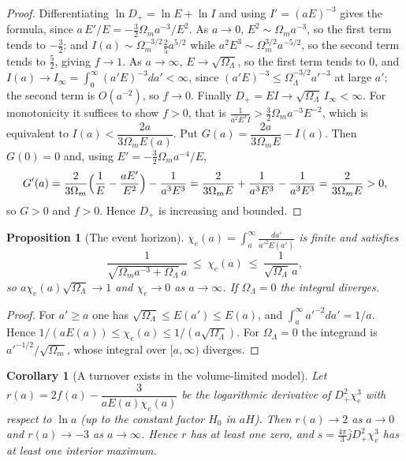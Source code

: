 \documentclass[11pt,oneside]{book}
\newtheorem{proposition}[theorem]{Proposition}
\newtheorem{corollary}[theorem]{Corollary}
\theoremstyle{definition}
\theoremstyle{remark}
\begin{document}
\begin{proof}
Differentiating $\ln D_+=\ln E+\ln I$ and using $I'=(aE)^{-3}$ gives the formula, since $a\,E'/E=-\tfrac32\Omega_ma^{-3}/E^2$. As $a\to0$, $E^2\sim\Omega_ma^{-3}$, so the first term tends to $-\tfrac32$; and $I(a)\sim\Omega_m^{-3/2}\tfrac25a^{5/2}$ while $a^2E^3\sim\Omega_m^{3/2}a^{-5/2}$, so the second term tends to $\tfrac52$, giving $f\to1$. As $a\to\infty$, $E\to\sqrt{\Omega_\Lambda}$, so the first term tends to $0$, and $I(a)\to I_\infty=\int_0^\infty(a'E)^{-3}da'<\infty$, since $(a'E)^{-3}\leq\Omega_\Lambda^{-3/2}a'^{-3}$ at large $a'$; the second term is $O(a^{-2})$, so $f\to0$. Finally $D_+=EI\to\sqrt{\Omega_\Lambda}\,I_\infty<\infty$. For monotonicity it suffices to show $f>0$, that is $\frac1{a^2E^3I}>\frac32\Omega_ma^{-3}E^{-2}$, which is equivalent to $I(a)<\dfrac{2a}{3\Omega_mE(a)}$. Put $G(a)=\dfrac{2a}{3\Omega_mE}-I(a)$. Then $G(0)=0$ and, using $E'=-\tfrac32\Omega_ma^{-4}/E$,
\[
G'(a)=\frac2{3\Omega_m}\Bigl(\frac1E-\frac{aE'}{E^2}\Bigr)-\frac1{a^3E^3}=\frac2{3\Omega_mE}+\frac1{a^3E^3}-\frac1{a^3E^3}=\frac2{3\Omega_mE}>0,
\]
so $G>0$ and $f>0$. Hence $D_+$ is increasing and bounded.
\end{proof}

\begin{proposition}[The event horizon]\label{prop:app-horizon}
$\chi_e(a)=\int_a^\infty\frac{da'}{a'^2E(a')}$ is finite and satisfies
\[
\frac1{\sqrt{\Omega_ma^{-3}+\Omega_\Lambda}\,a}\ \leq\ \chi_e(a)\ \leq\ \frac1{\sqrt{\Omega_\Lambda}\,a},
\]
so $a\chi_e(a)\sqrt{\Omega_\Lambda}\to1$ and $\chi_e\to0$ as $a\to\infty$. If $\Omega_\Lambda=0$ the integral diverges.
\end{proposition}

\begin{proof}
For $a'\geq a$ one has $\sqrt{\Omega_\Lambda}\leq E(a')\leq E(a)$, and $\int_a^\infty a'^{-2}da'=1/a$. Hence $1/(aE(a))\leq\chi_e(a)\leq1/(a\sqrt{\Omega_\Lambda})$. For $\Omega_\Lambda=0$ the integrand is $a'^{-1/2}/\sqrt{\Omega_m}$, whose integral over $[a,\infty)$ diverges.
\end{proof}

\begin{corollary}[A turnover exists in the volume-limited model]\label{cor:app-turnover}
Let $r(a)=2f(a)-\dfrac{3}{aE(a)\chi_e(a)}$ be the logarithmic derivative of $D_+^2\chi_e^3$ with respect to $\ln a$ (up to the constant factor $H_0$ in $aH$). Then $r(a)\to2$ as $a\to0$ and $r(a)\to-3$ as $a\to\infty$. Hence $r$ has at least one zero, and $s=\tfrac{4\pi}3\bar jD_+^2\chi_e^3$ has at least one interior maximum.
\end{corollary}
\end{document}
